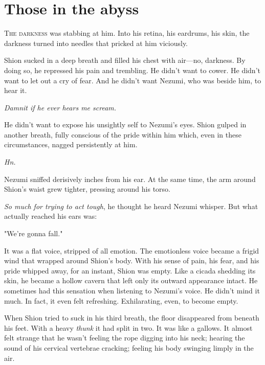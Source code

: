 
\chapter{Those in the abyss}


\lettrine{T}{he darkness} was stabbing at him. Into his retina, his eardrums, his
skin, the darkness turned into needles that pricked at him viciously.

Shion sucked in a deep breath and filled his chest with air---no,
darkness. By doing so, he repressed his pain and trembling. He didn't
want to cower. He didn't want to let out a cry of fear. And he didn't
want Nezumi, who was beside him, to hear it.

\emph{Damnit if he ever hears me scream.}

He didn't want to expose his unsightly self to Nezumi's eyes. Shion
gulped in another breath, fully conscious of the pride within him which,
even in these circumstances, nagged persistently at him.

\emph{Hn.}

Nezumi sniffed derisively inches from his ear. At the same time, the arm
around Shion's waist grew tighter, pressing around his torso.

\emph{So much for trying to act tough}, he thought he heard Nezumi whisper. But
what actually reached his ears was:

"We're gonna fall."

It was a flat voice, stripped of all emotion. The emotionless voice
became a frigid wind that wrapped around Shion's body. With his sense of
pain, his fear, and his pride whipped away, for an instant, Shion was
empty. Like a cicada shedding its skin, he became a hollow cavern that
left only its outward appearance intact. He sometimes had this sensation
when listening to Nezumi's voice. He didn't mind it much. In fact, it
even felt refreshing. Exhilarating, even, to become empty.

When Shion tried to suck in his third breath, the floor disappeared from
beneath his feet. With a heavy \emph{thunk} it had split in two. It was like a
gallows. It almost felt strange that he wasn't feeling the rope digging
into his neck; hearing the sound of his cervical vertebrae cracking;
feeling his body swinging limply in the air.

